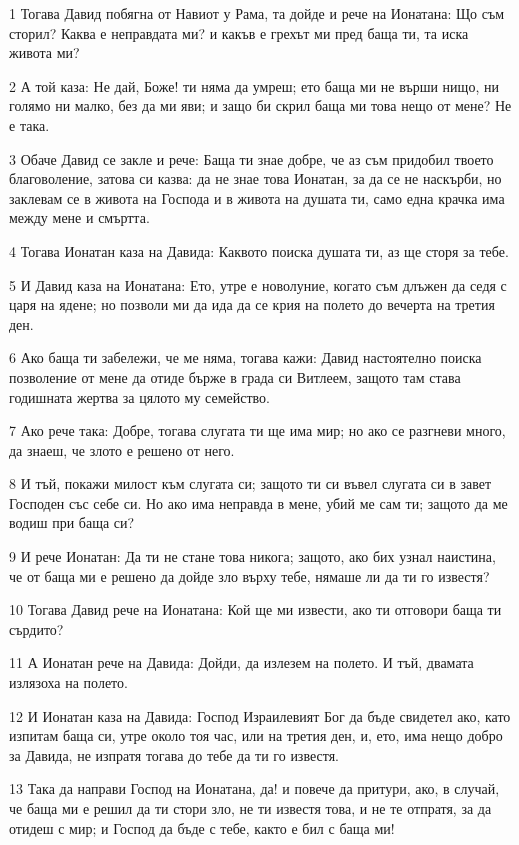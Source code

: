 \par 1 Тогава Давид побягна от Навиот у Рама, та дойде и рече на Ионатана: Що съм сторил? Каква е неправдата ми? и какъв е грехът ми пред баща ти, та иска живота ми?
\par 2 А той каза: Не дай, Боже! ти няма да умреш; ето баща ми не върши нищо, ни голямо ни малко, без да ми яви; и защо би скрил баща ми това нещо от мене? Не е така.
\par 3 Обаче Давид се закле и рече: Баща ти знае добре, че аз съм придобил твоето благоволение, затова си казва: да не знае това Ионатан, за да се не наскърби, но заклевам се в живота на Господа и в живота на душата ти, само една крачка има между мене и смъртта.
\par 4 Тогава Ионатан каза на Давида: Каквото поиска душата ти, аз ще сторя за тебе.
\par 5 И Давид каза на Ионатана: Ето, утре е новолуние, когато съм длъжен да седя с царя на ядене; но позволи ми да ида да се крия на полето до вечерта на третия ден.
\par 6 Ако баща ти забележи, че ме няма, тогава кажи: Давид настоятелно поиска позволение от мене да отиде бърже в града си Витлеем, защото там става годишната жертва за цялото му семейство.
\par 7 Ако рече така: Добре, тогава слугата ти ще има мир; но ако се разгневи много, да знаеш, че злото е решено от него.
\par 8 И тъй, покажи милост към слугата си; защото ти си въвел слугата си в завет Господен със себе си. Но ако има неправда в мене, убий ме сам ти; защото да ме водиш при баща си?
\par 9 И рече Ионатан: Да ти не стане това никога; защото, ако бих узнал наистина, че от баща ми е решено да дойде зло върху тебе, нямаше ли да ти го известя?
\par 10 Тогава Давид рече на Ионатана: Кой ще ми извести, ако ти отговори баща ти сърдито?
\par 11 А Ионатан рече на Давида: Дойди, да излезем на полето. И тъй, двамата излязоха на полето.
\par 12 И Ионатан каза на Давида: Господ Израилевият Бог да бъде свидетел ако, като изпитам баща си, утре около тоя час, или на третия ден, и, ето, има нещо добро за Давида, не изпратя тогава до тебе да ти го известя.
\par 13 Така да направи Господ на Ионатана, да! и повече да притури, ако, в случай, че баща ми е решил да ти стори зло, не ти известя това, и не те отпратя, за да отидеш с мир; и Господ да бъде с тебе, както е бил с баща ми!
